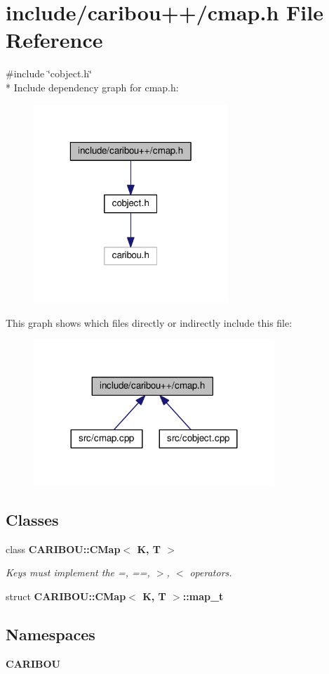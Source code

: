 \section{include/caribou++/cmap.h File Reference}
\label{cmap_8h}
{\ttfamily \#include \char`\"{}cobject.\-h\char`\"{}}\\*
Include dependency graph for cmap.\-h\-:\nopagebreak
\begin{figure}[H]
\begin{center}
\leavevmode
\includegraphics[width=208pt]{cmap_8h__incl}
\end{center}
\end{figure}
This graph shows which files directly or indirectly include this file\-:\nopagebreak
\begin{figure}[H]
\begin{center}
\leavevmode
\includegraphics[width=257pt]{cmap_8h__dep__incl}
\end{center}
\end{figure}
\subsection*{Classes}
\begin{DoxyCompactItemize}
\item 
class {\bf C\-A\-R\-I\-B\-O\-U\-::\-C\-Map$<$ K, T $>$}
\begin{DoxyCompactList}\small\item\em Keys must implement the =, ==, $>$, $<$ operators. \end{DoxyCompactList}\item 
struct {\bf C\-A\-R\-I\-B\-O\-U\-::\-C\-Map$<$ K, T $>$\-::map\-\_\-t}
\end{DoxyCompactItemize}
\subsection*{Namespaces}
\begin{DoxyCompactItemize}
\item 
{\bf C\-A\-R\-I\-B\-O\-U}
\end{DoxyCompactItemize}
